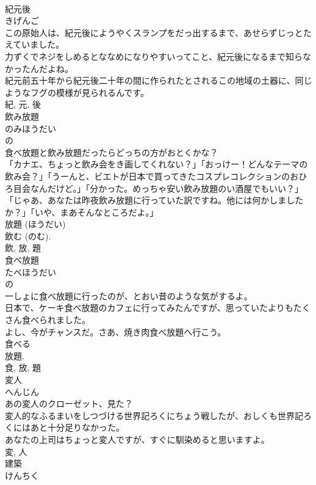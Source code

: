 \documentclass[8pt]{extreport}
\begin{document}
\begin{CJK}{UTF8}{min}
\\	紀元後	
\\	きげんご	
\\	この原始人は、紀元後にようやくスランプをだっ出するまで、あせらずじっとたえていました。	
\\	力ずくでネジをしめるとななめになりやすいってこと、紀元後になるまで知らなかったんだよね。	
\\	紀元前五十年から紀元後二十年の間に作られたとされるこの地域の土器に、同じようなフグの模様が見られるんです。	
\\	紀, 元, 後	
\\	飲み放題	
\\	のみほうだい	
\\	の 
\\	食べ放題と飲み放題だったらどっちの方がおとくかな？	
\\	「カナエ、ちょっと飲み会をき画してくれない？」「おっけー！どんなテーマの飲み会？」「うーんと、ビエトが日本で買ってきたコスプレコレクションのおひろ目会なんだけど。」「分かった。めっちゃ安い飲み放題のい酒屋でもいい？」	
\\	「じゃあ、あなたは昨夜飲み放題に行っていた訳ですね。他には何かしましたか？」「いや、まあそんなところだよ。」	
\\	放題 (ほうだい) 
\\	飲む (のむ). 
\\	飲, 放, 題	
\\	食べ放題	
\\	たべほうだい	
\\	の 
\\	一しょに食べ放題に行ったのが、とおい昔のような気がするよ。	
\\	日本で、ケーキ食べ放題のカフェに行ってみたんですが、思っていたよりもたくさん食べられました。	
\\	よし、今がチャンスだ。さあ、焼き肉食べ放題へ行こう。	
\\	食べる 
\\	放題. 
\\	食, 放, 題	
\\	変人	
\\	へんじん	
\\	あの変人のクローゼット、見た？	
\\	変人的なふるまいをしつづける世界記ろくにちょう戦したが、おしくも世界記ろくにはあと十分足りなかった。	
\\	あなたの上司はちょっと変人ですが、すぐに馴染めると思いますよ。	
\\	変, 人	
\\	建築	
\\	けんちく	

\end{CJK}
\end{document}
